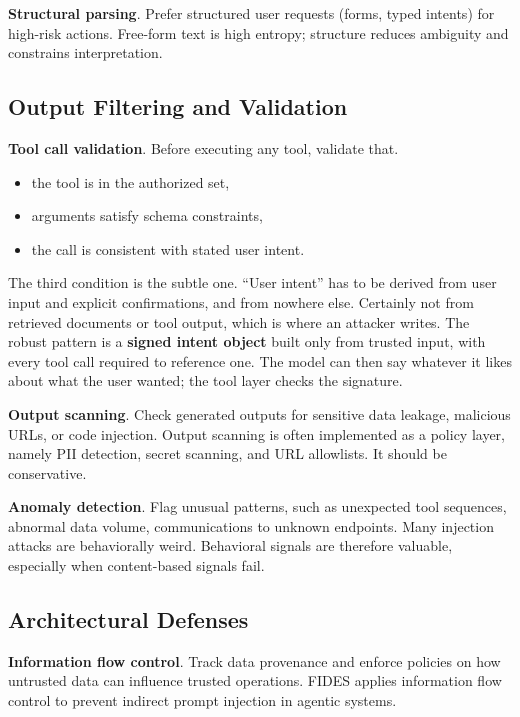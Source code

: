 \textbf{Structural parsing}. Prefer structured user requests (forms, typed intents) for high-risk actions. Free-form text is high entropy; structure reduces ambiguity and constrains interpretation.

\subsection{Output Filtering and Validation}

\textbf{Tool call validation}. Before executing any tool, validate that.
\begin{itemize}
\item the tool is in the authorized set,
\item arguments satisfy schema constraints,
\item the call is consistent with stated user intent.
\end{itemize}

The third condition is the subtle one. ``User intent'' has to be derived from user
input and explicit confirmations, and from nowhere else. Certainly not from retrieved documents or tool output, which is where an attacker writes. The robust
pattern is a \textbf{signed intent object} built only from trusted input, with
every tool call required to reference one. The model can then say whatever it
likes about what the user wanted; the tool layer checks the signature.

\textbf{Output scanning}. Check generated outputs for sensitive data leakage, malicious URLs, or code injection. Output scanning is often implemented as a policy layer, namely PII detection, secret scanning, and URL allowlists. It should be conservative.

\textbf{Anomaly detection}. Flag unusual patterns, such as unexpected tool sequences, abnormal data volume, communications to unknown endpoints. Many injection attacks are behaviorally weird. Behavioral signals are therefore valuable, especially when content-based signals fail.

\subsection{Architectural Defenses}

\textbf{Information flow control}. Track data provenance and enforce policies on how untrusted data can influence trusted operations. FIDES \cite{fides2025} applies information flow control to prevent indirect prompt injection in agentic systems.

